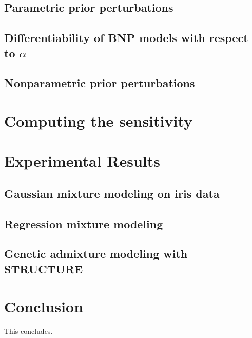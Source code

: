 \documentclass[11pt]{article}
\begin{document}
    \subsection{Parametric prior perturbations}
    

    \subsection{Differentiability of BNP models with respect to $\alpha$}
    

    \subsection{Nonparametric prior perturbations}
    


\section{Computing the sensitivity}


\section{Experimental Results}


    \subsection{Gaussian mixture modeling on iris data}
    

    \subsection{Regression mixture modeling}
    

    \subsection{Genetic admixture modeling with STRUCTURE}
    

\section{Conclusion}
This concludes.
\end{document}
